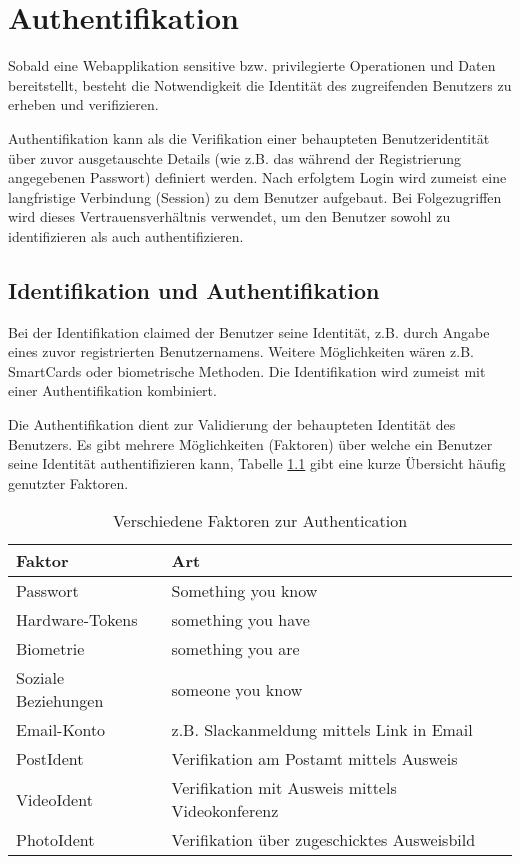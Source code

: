 \chapter{Authentifikation}

Sobald eine Webapplikation sensitive bzw. privilegierte Operationen und Daten bereitstellt, besteht die Notwendigkeit die Identität des zugreifenden Benutzers zu erheben und verifizieren.

Authentifikation kann als die Verifikation einer behaupteten Benutzeridentität über zuvor ausgetauschte Details (wie z.B. das während der Registrierung angegebenen Passwort) definiert werden. Nach erfolgtem Login wird zumeist eine langfristige Verbindung (Session) zu dem Benutzer aufgebaut. Bei Folgezugriffen wird dieses Vertrauensverhältnis verwendet, um den Benutzer sowohl zu identifizieren als auch authentifizieren.

\section{Identifikation und Authentifikation}

Bei der Identifikation claimed der Benutzer seine Identität, z.B. durch Angabe eines zuvor registrierten Benutzernamens. Weitere Möglichkeiten wären z.B. SmartCards oder biometrische Methoden. Die Identifikation wird zumeist mit einer Authentifikation kombiniert.

Die Authentifikation dient zur Validierung der behaupteten Identität des Benutzers. Es gibt mehrere Möglichkeiten (Faktoren) über welche ein Benutzer seine Identität authentifizieren kann, Tabelle \ref{tbl:factors} gibt eine kurze Übersicht häufig genutzter Faktoren.

\begin{table}[h!]
	\begin{center}
\begin{tabular}{lp{7cm}}
	\toprule
	Faktor & Art\\
	\midrule
	Passwort & Something you know \\
	Hardware-Tokens & something you have \\
	Biometrie & something you are \\
	Soziale Beziehungen & someone you know \\
	Email-Konto & z.B. Slackanmeldung mittels Link in Email \\
	PostIdent & Verifikation am Postamt mittels Ausweis \\
	VideoIdent & Verifikation mit Ausweis mittels Videokonferenz \\
	PhotoIdent & Verifikation über zugeschicktes Ausweisbild \\
	\bottomrule
\end{tabular}
	\caption{Verschiedene Faktoren zur Authentication}
	\label{tbl:factors}
\end{center}
\end{table}

